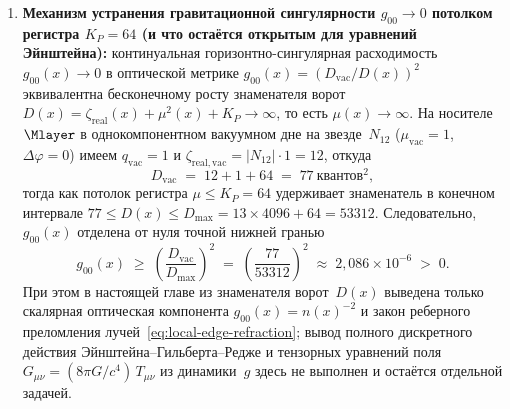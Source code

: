 \begin{proposition}
\begin{enumerate}[label=(\roman*)]
\begin{enumerate}[label=(\alph*)]
    масштабная инвариантность без трансмутации) никакая физическая щель массы не может не зависеть от шага обрезания~$\htick$,
    и всякое утверждение о выводе континуальной щели Янга--Миллса в модели несостоятельно по построению.
  \end{enumerate}
\item \textbf{Механизм устранения гравитационной сингулярности $g_{00}\to 0$ потолком регистра $K_P=64$ (и что остаётся открытым для уравнений Эйнштейна):}
  континуальная горизонтно-сингулярная расходимость $g_{00}(x)\to 0$ в оптической метрике $g_{00}(x) = (D_{\mathrm{vac}}/D(x))^2$
  эквивалентна бесконечному росту знаменателя ворот $D(x) = \zeta_{\mathrm{real}}(x) + \mu^2(x) + K_P \to \infty$, то есть $\mu(x)\to\infty$.
  На носителе~$\Mlayer$ в однокомпонентном вакуумном дне на звезде~$N_{12}$ ($\mu_{\mathrm{vac}}=1$, $\Delta\varphi=0$) имеем $q_{\mathrm{vac}}=1$
  и $\zeta_{\mathrm{real,vac}}=|N_{12}|\cdot 1 = 12$, откуда
  \[
    D_{\mathrm{vac}} \;=\; 12 + 1 + 64 \;=\; 77\ \text{квантов}^2,
  \]
  тогда как потолок регистра $\mu\le K_P=64$ удерживает знаменатель в конечном интервале $77 \le D(x) \le D_{\max} = 13\times 4096 + 64 = 53312$.
  Следовательно, $g_{00}(x)$ отделена от нуля точной нижней гранью
  \[
    g_{00}(x) \;\ge\; \left(\frac{D_{\mathrm{vac}}}{D_{\max}}\right)^{\!2} \;=\; \left(\frac{77}{53312}\right)^{\!2} \;\approx\; 2{,}086\times 10^{-6} \;>\; 0.
  \]
  При этом в настоящей главе из знаменателя ворот~$D(x)$ выведена только скалярная оптическая компонента $g_{00}(x) = n(x)^{-2}$
  и закон реберного преломления лучей~\eqref{eq:local-edge-refraction}; вывод полного дискретного действия Эйнштейна--Гильберта--Редже
  и тензорных уравнений поля $G_{\mu\nu} = (8\pi G/c^4)\,T_{\mu\nu}$ из динамики~$g$ здесь не выполнен и остаётся отдельной задачей.
\end{enumerate}
\end{proposition}

